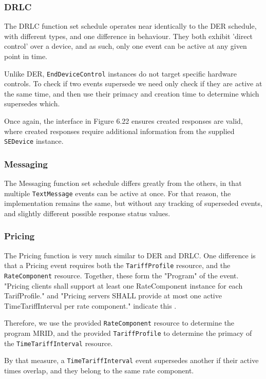 \subsubsection{DRLC}
The DRLC function set schedule operates near identically to the DER schedule, with different types, and one difference in behaviour. They both exhibit 'direct control' over a device, and as such, only one event can be active at any given point in time.

Unlike DER, \texttt{EndDeviceControl} instances do not target specific hardware controls. To check if two events supersede we need only check if they are active at the same time, and then use their primacy and creation time to determine which supersedes which.

Once again, the interface in Figure 6.22 ensures created responses are valid, where created responses require additional information from the supplied \texttt{SEDevice} instance. 

\subsubsection{Messaging}
The Messaging function set schedule differs greatly from the others, in that multiple \texttt{TextMessage} events can be active at once. For that reason, the implementation remains the same, but without any tracking of superseded events, and slightly different possible response status values. 

\subsubsection{Pricing}
The Pricing function is very much similar to DER and DRLC. One difference is that a Pricing event requires both the \texttt{TariffProfile} resource, and the \texttt{RateComponent} resource. Together, these form the "Program" of the event. "Pricing clients shall support at least one RateComponent instance for each TarifProfile." and "Pricing servers SHALL provide at most one active TimeTariffInterval per rate component." indicate this \cite{IEEE2030.5}.

Therefore, we use the provided \texttt{RateComponent} resource to determine the program MRID, and the provided \texttt{TariffProfile} to determine the primacy of the \texttt{TimeTariffInterval} resource. 

By that measure, a \texttt{TimeTariffInterval} event supersedes another if their active times overlap, and they belong to the same rate component.

